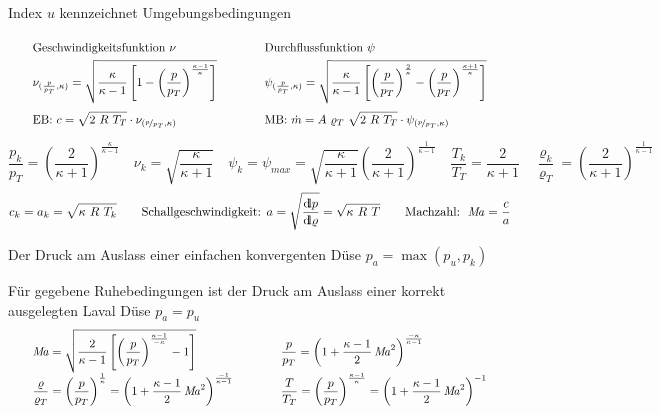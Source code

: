 	Index $ u $ kennzeichnet Umgebungsbedingungen
%
	\skipabove{0pt}
		\[ \arraycolsep=2em\def\arraystretch{2}
		\begin{array}{ll}
			  \text{Geschwindigkeitsfunktion }  \nu & \text{Durchflussfunktion }  \psi
			\\
			   \nu_{(\frac{p}{p_T},\kappa)} =
			  	\sqrt{\dfrac{\kappa}{\kappa-1}
			  		\left[1 -
			  			\left(\dfrac{p}{p_T}\right)
			  				^{\frac{\kappa-1}{\kappa}}
			  		\right]}
			&  \psi_{(\frac{p}{p_T},\kappa)} =
				\sqrt{ \dfrac{\kappa}{\kappa-1}
					\left[
						\left(\dfrac{p}{p_T}\right)
							^{\frac{2}{\kappa}}
							-
						\left(\dfrac{p}{p_T}\right)
							^{\frac{\kappa+1}{\kappa}}
					\right]}
			\\
			  \text{EB: } c = \displaystyle\sqrt{2\ R\ T_T} \cdot \nu_{(\nicefrac{p}{p_T},\kappa)}
			& \text{MB: } \dot{m} = A\ \varrho_T\ \displaystyle\sqrt{2\ R\ T_T} \cdot \psi_{(\nicefrac{p}{p_T},\kappa)}
		\end{array}\]
%
	\skipabove{0pt}
	\[
		\dfrac{p_k}{p_T} =
			\left(\dfrac{2}{\kappa+1}\right)
				^{\frac{\kappa}{\kappa-1}}
	\quad
		\nu_k = \sqrt{\dfrac{\kappa}{\kappa+1}}
	\quad
		\psi_k = \psi_{max} =
			\sqrt{\dfrac{\kappa}{\kappa+1}}
			\left(\dfrac{2}{\kappa+1}\right)
				^{\frac{1}{\kappa-1}}
	\quad
		\dfrac{T_k}{T_T} = \dfrac{2}{\kappa + 1}
	\quad
		\dfrac{\varrho_k}{\varrho_T} =
			\left(\dfrac{2}{\kappa+1}\right)
				^{\frac{1}{\kappa-1}}
	 \]
%
	\[
		c_k = a_k = \sqrt{\kappa \ R\ T_k}
	\qquad
		\text{Schallgeschwindigkeit: }
		a = \sqrt{\dfrac{{\operatorname{d\!l}} p}{{\operatorname{d\!l}}\varrho}}
			= \sqrt{\kappa \ R\ T}
	\qquad
		\text{Machzahl: }
		\operatorname{\mathit{M\kern-.20em a}} = \dfrac{c}{a}
	 \]

	Der Druck am Auslass einer einfachen konvergenten Düse $ p_a = \max(p_u, p_k) $

	Für gegebene Ruhebedingungen ist der Druck am Auslass einer korrekt ausgelegten Laval Düse $ p_a = p_u  $
%
	\skipabove{10pt}
	\[ \arraycolsep=2em\def\arraystretch{2}
	\begin{array}{ll}
		\Mach  =
		\sqrt{\dfrac{2}{\kappa-1}
			\left[\left(
				\dfrac{p}{p_T}
				\right)
					^{\frac{\kappa-1}{- \kappa}} - 1
			\right]}
		&
		\dfrac{p}{p_T}  =
			\left( 1 +
				\dfrac{\kappa-1}{2}  \Mach^2
			\right)
				^{\frac{- \kappa}{\kappa - 1}}
	\\
		\dfrac{\varrho}{\varrho_T}  =
		\left( \dfrac{p}{p_T} \right)
			^{\frac{1}{\kappa}} =
		\left( 1 +
			\dfrac{\kappa - 1}{2}  \Mach^2
		\right)
			^{\frac{- 1}{\kappa - 1}}
		&
		\dfrac{T}{T_T}  =
		\left( \dfrac{p}{p_T} \right)
			^{\frac{\kappa-1}{\kappa}} =
		\left( 1 +
			\dfrac{\kappa-1}{2}  \Mach^2
		\right)
			^{-1}
	\end{array}\]

